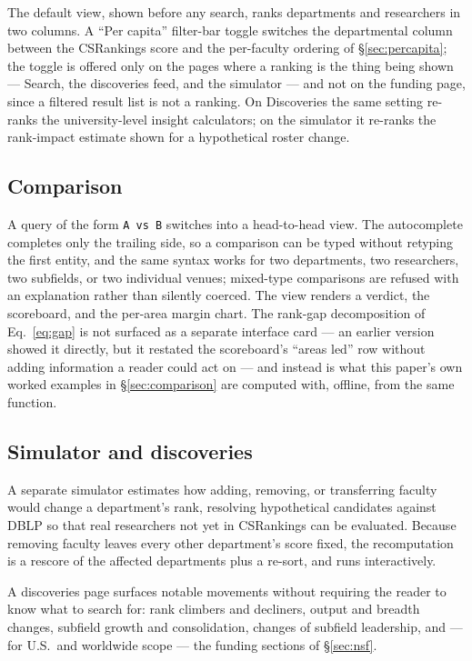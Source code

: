 \documentclass[11pt]{article}
\newcommand{\csr}{CSRankings}
\begin{document}
The default view, shown before any search, ranks departments and researchers in
two columns. A ``Per capita'' filter-bar toggle switches the departmental
column between the \csr{} score and the per-faculty ordering of
\S\ref{sec:percapita}; the toggle is offered only on the pages where a
ranking is the thing being shown --- Search, the discoveries feed, and the
simulator --- and not on the funding page, since a filtered result list is not
a ranking. On Discoveries the same setting re-ranks the university-level
insight calculators; on the simulator it re-ranks the rank-impact estimate
shown for a hypothetical roster change.

\subsection{Comparison}

A query of the form \texttt{A vs B} switches into a head-to-head view. The
autocomplete completes only the trailing side, so a comparison can be typed
without retyping the first entity, and the same syntax works for two
departments, two researchers, two subfields, or two individual venues; mixed-type
comparisons are refused with an explanation rather than silently coerced. The
view renders a verdict, the scoreboard, and the per-area margin chart. The
rank-gap decomposition of Eq.~\ref{eq:gap} is not surfaced as a separate
interface card --- an earlier version showed it directly, but it restated the
scoreboard's ``areas led'' row without adding information a reader could act
on --- and instead is what this paper's own worked examples in
\S\ref{sec:comparison} are computed with, offline, from the same function.

\subsection{Simulator and discoveries}

A separate simulator estimates how adding, removing, or transferring faculty
would change a department's rank, resolving hypothetical candidates against
DBLP so that real researchers not yet in \csr{} can be evaluated. Because
removing faculty leaves every other department's score fixed, the recomputation
is a rescore of the affected departments plus a re-sort, and runs
interactively.

A discoveries page surfaces notable movements without requiring the reader to
know what to search for: rank climbers and decliners, output and breadth
changes, subfield growth and consolidation, changes of subfield leadership, and
--- for U.S.\ and worldwide scope --- the funding sections of
\S\ref{sec:nsf}.
\end{document}
